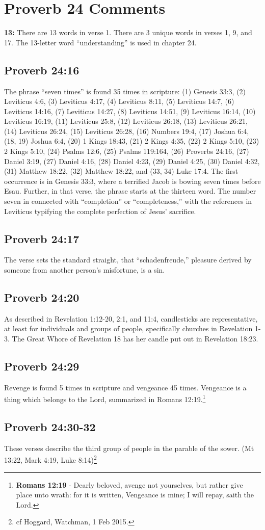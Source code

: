 \section{Proverb 24 Comments}

\textbf{13:} There are 13 words in verse 1. There are 3 unique words in verses 1, 9, and 17. The 13-letter word ``understanding'' is used in chapter 24. 

\subsection{Proverb 24:16}
The phrase ``seven times'' is found 35 times in scripture: (1) Genesis 33:3, (2) Leviticus 4:6, (3) Leviticus 4:17, (4) Leviticus 8:11, (5) Leviticus 14:7, (6) Leviticus 14:16, (7) Leviticus 14:27, (8) Leviticus 14:51, (9) Leviticus 16:14, (10) Leviticus 16:19, (11) Leviticus 25:8, (12) Leviticus 26:18, (13) Leviticus 26:21, (14) Leviticus 26:24, (15) Leviticus 26:28, (16) Numbers 19:4, (17) Joshua 6:4, (18, 19) Joshua 6:4, (20) 1 Kings 18:43,  (21) 2 Kings 4:35, (22) 2 Kings 5:10, (23) 2 Kings 5:10, (24) Psalms 12:6, (25) Psalms 119:164, (26) Proverbs 24:16, (27) Daniel 3:19, (27) Daniel 4:16, (28) Daniel 4:23, (29) Daniel 4:25, (30) Daniel 4:32,  (31) Matthew 18:22, (32) Matthew 18:22, and (33, 34) Luke 17:4. The first occurrence is in Genesis 33:3, where a terrified Jacob is bowing seven times before Esau. Further, in that verse, the phrase starts at the thirteen word. The number seven in connected with ``completion'' or ``completeness,'' with the references in Leviticus typifying the complete perfection of Jesus' sacrifice.

\subsection{Proverb 24:17}
The verse sets the standard straight, that ``schadenfreude,'' pleasure derived by someone from another person's misfortune, is a sin.

\subsection{Proverb 24:20}
As described in Revelation 1:12-20, 2:1, and 11:4, candlesticks are representative, at least for individuals and groups of people, specifically churches in Revelation 1-3.  The Great Whore of Revelation 18 has her candle put out in Revelation 18:23.

\subsection{Proverb 24:29}
Revenge is found 5 times in scripture and vengeance 45 times. Vengeance is a thing which belongs to the Lord, summarized in Romans 12:19.\footnote{\textbf{Romans 12:19} - Dearly beloved, avenge not yourselves, but rather give place unto wrath: for it is written, Vengeance is mine; I will repay, saith the Lord.}

\subsection{Proverb 24:30-32}
These verses describe the third group of people in the parable of the sower. (Mt 13:22, Mark 4:19, Luke 8:14)\footnote{cf Hoggard, Watchman, 1 Feb 2015.} 